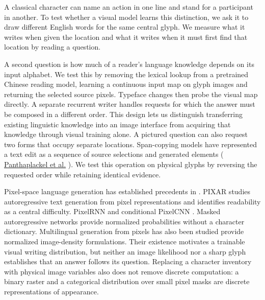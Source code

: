 \documentclass[12pt,a4paper]{article}
\providecommand{\DIFadd}[1]{{\protect\color{blue} \sf #1}} %
\providecommand{\DIFdel}[1]{{\protect\color{red} \scriptsize #1}} %
\providecommand{\DIFaddbegin}{} %
\providecommand{\DIFaddend}{} %
\providecommand{\DIFdelbegin}{} %
\providecommand{\DIFdelend}{} %
\begin{document}
\DIFadd{A classical character can name an action in one line and stand for a participant in another. To test whether a visual model learns this distinction, we ask it to draw different English words for the same central glyph. We measure what it writes when given the location and what it writes when it must first find that location by reading a question.
}

\DIFadd{A second question is how much of a reader's language knowledge depends on its input alphabet. We test this by removing the lexical lookup from a pretrained Chinese reading model, learning a continuous input map on glyph images and returning the selected source pixels. Typeface changes then probe the visual map directly. A separate recurrent writer handles requests for which the answer must be composed in a different order. This design lets us distinguish transferring existing linguistic knowledge into an image interface from acquiring that knowledge through visual training alone. A pictured question can also request two forms that occupy separate locations. Span-copying models have represented a text edit as a sequence of source selections and generated elements (}\href{https://arxiv.org/abs/2006.04771}{\DIFadd{Panthaplackel et al.}}\DIFadd{). We test this operation on physical glyphs by reversing the requested order while retaining identical evidence.
}

\DIFadd{Pixel-space language generation }\DIFaddend has established precedents\DIFdelbegin \DIFdel{in }\DIFdelend \DIFaddbegin \DIFadd{. PIXAR studies
autoregressive text generation from pixel representations and identifies
readability as a central difficulty\cite{pixar}. }\DIFaddend PixelRNN and conditional
PixelCNN \DIFdelbegin \DIFdel{\cite{pixelrnn,pixelcnn}. Masked autoregressive networks
provide normalized probabilities without a character dictionary\cite{made}. Multilingual generation from pixels has also
been studied\cite{mixar}}\DIFdelend \DIFaddbegin \DIFadd{provide normalized image-density formulations\cite{pixelrnn,pixelcnn}.
Their existence motivates a trainable visual writing distribution, but neither
an image likelihood nor a sharp glyph establishes that an answer follows its
question. Replacing a character inventory with physical image variables also
does not remove discrete computation: a binary raster and a categorical
distribution over small pixel masks are discrete representations of appearance}\DIFaddend .
\end{document}
